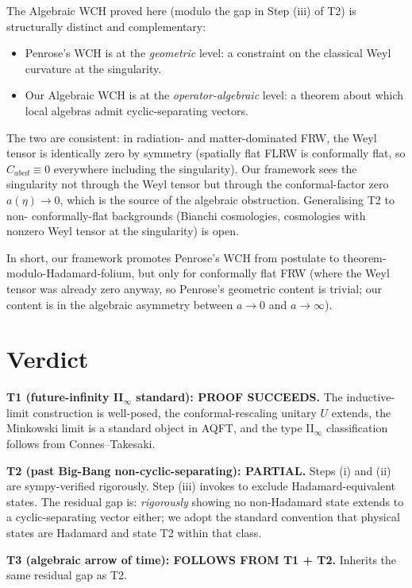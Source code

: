 \documentclass[11pt]{article}
\theoremstyle{definition}
\begin{document}
The Algebraic WCH proved here (modulo the gap in Step (iii) of T2) is
structurally distinct and complementary:
\begin{itemize}
\item Penrose's WCH is at the \emph{geometric} level: a constraint on the
classical Weyl curvature at the singularity.
\item Our Algebraic WCH is at the \emph{operator-algebraic} level: a
theorem about which local algebras admit cyclic-separating vectors.
\end{itemize}
The two are consistent: in radiation- and matter-dominated FRW, the
Weyl tensor is identically zero by symmetry (spatially flat FLRW is
conformally flat, so $C_{abcd}\equiv 0$ everywhere including the
singularity). Our framework sees the singularity not through the Weyl
tensor but through the conformal-factor zero $a(\eta)\to 0$, which is
the source of the algebraic obstruction. Generalising T2 to non-
conformally-flat backgrounds (Bianchi cosmologies, cosmologies with
nonzero Weyl tensor at the singularity) is open.

In short, our framework promotes Penrose's WCH from postulate to
theorem-modulo-Hadamard-folium, but only for conformally flat FRW
(where the Weyl tensor was already zero anyway, so Penrose's
geometric content is trivial; our content is in the algebraic
asymmetry between $a\to 0$ and $a\to\infty$).

\section{Verdict}

\textbf{T1 (future-infinity II$_\infty$ standard): PROOF SUCCEEDS.}
The inductive-limit construction is well-posed, the conformal-rescaling
unitary $U$ extends, the Minkowski limit is a standard object in AQFT,
and the type II$_\infty$ classification follows from Connes--Takesaki.

\textbf{T2 (past Big-Bang non-cyclic-separating): PARTIAL.}
Steps (i) and (ii) are sympy-verified rigorously. Step (iii) invokes
\cite{HollandsWald2001, BrunettiFredenhagenVerch2003} to exclude
Hadamard-equivalent states. The residual gap is: \emph{rigorously}
showing no non-Hadamard state extends to a cyclic-separating vector
either; we adopt the standard convention that physical states are
Hadamard and state T2 within that class.

\textbf{T3 (algebraic arrow of time): FOLLOWS FROM T1 + T2.} Inherits
the same residual gap as T2.
\end{document}

